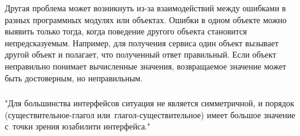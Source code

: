 \documentclass{../industrial-development}
\begin{document}
Другая проблема может возникнуть из-за взаимодействий между ошибками в разных программных модулях или объектах. Ошибки в одном объекте можно выявить только тогда, когда поведение другого объекта становится непредсказуемым. Например, для получения сервиса один объект вызывает другой объект и полагает, что полученный ответ правильный. Если объект неправильно понимает вычисленные значения, возвращаемое значение может быть достоверным, но неправильным.


\begin{frame} \frametitle{}
"Для большинства интерфейсов ситуация не является симметричной, и порядок (существительное-глагол или~глагол-существительное) имеет большое значение с~точки зрения юзабилити интерфейса."
\end{frame}


\end{document}
